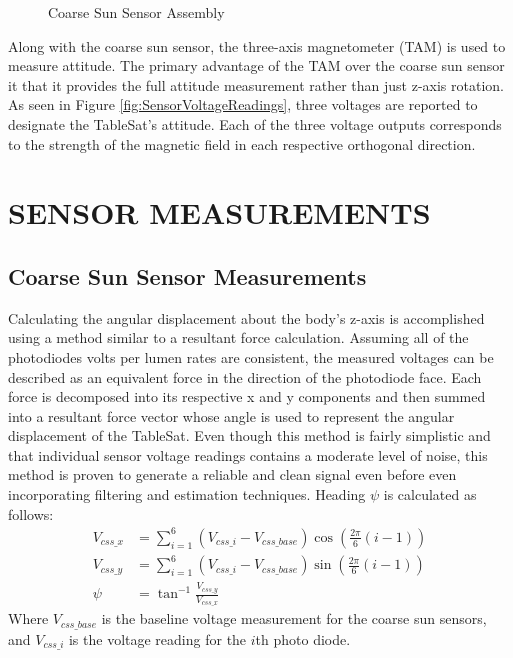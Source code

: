 \begin{figure}[ht]
  \centerline{}
  \caption{Coarse Sun Sensor Assembly}
  \label{fig:CoarseSunSensorAssembly}
\end{figure}

Along with the coarse sun sensor, the three-axis magnetometer (TAM) is used to measure attitude.  The primary advantage of the TAM over the coarse sun sensor it that it provides the full attitude measurement rather than just z-axis rotation.  As seen in Figure \ref{fig:SensorVoltageReadings}, three voltages are reported to designate the TableSat's attitude.  Each of the three voltage outputs corresponds to the strength of the magnetic field in each respective orthogonal direction.

\chapter{SENSOR MEASUREMENTS}
\label{chap:SensorMeasurements}

\section{Coarse Sun Sensor Measurements}

Calculating the angular displacement about the body's z-axis is accomplished using a method similar to a resultant force calculation.  Assuming all of the photodiodes volts per lumen rates are consistent, the measured voltages can be described as an equivalent force in the direction of the photodiode face.  Each force is decomposed into its respective x and y components and then summed into a resultant force vector whose angle is used to represent the angular displacement of the TableSat.  Even though this method is fairly simplistic and that individual sensor voltage readings contains a moderate level of noise, this method is proven to generate a reliable and clean signal even before even incorporating filtering and estimation techniques.  Heading $\psi$ is calculated as follows:
\begin{subequations}
  \begin{align}
    V_{css\_x} & = \sum\limits_{i=1}^6 (V_{css\_i} - V_{css\_base}) \cos \left( \frac{2\pi}{6} (i-1)\right) \\
    V_{css\_y} & = \sum\limits_{i=1}^6 (V_{css\_i} - V_{css\_base}) \sin \left( \frac{2\pi}{6} (i-1)\right) \\
    \psi & = \tan^{-1} \frac{V_{css\_y}}{V_{css\_x}}
  \end{align}
  \label{eqn:CSSResultantForce}
\end{subequations}
Where $V_{css\_base}$ is the baseline voltage measurement for the coarse sun sensors, and $V_{css\_i}$ is the voltage reading for the $i$th photo diode.


